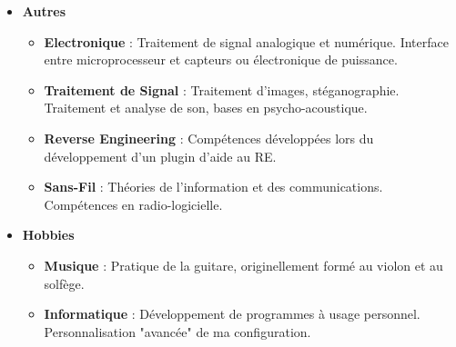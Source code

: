 \documentclass[11pt,a4paper,sans]{moderncv}        %
\begin{document}
\begin{itemize}
\item \textbf{Autres}
\begin{itemize}
\item \textbf{Electronique} : Traitement de signal analogique et numérique. Interface entre microprocesseur et capteurs ou électronique de puissance.
\item \textbf{Traitement de Signal} : Traitement d'images, stéganographie. Traitement et analyse de son, bases en psycho-acoustique.
\item \textbf{Reverse Engineering} : Compétences développées lors du développement d'un plugin d'aide au RE.
\item \textbf{Sans-Fil} : Théories de l'information et des communications. Compétences en radio-logicielle.
\end{itemize}

\vspace{6pt}

\item \textbf{Hobbies}
\begin{itemize}
\item \textbf{Musique} : Pratique de la guitare, originellement formé au violon et au solfège.
\item \textbf{Informatique} : Développement de programmes à usage personnel. Personnalisation "avancée" de ma configuration.
\end{itemize}
\end{itemize}


\nocite{*}



\end{document}
